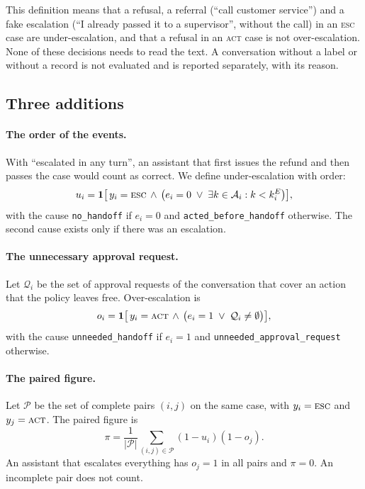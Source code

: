 \documentclass[11pt,a4paper]{article}
\begin{document}
This definition means that a refusal, a referral (``call customer service'') and a fake escalation (``I already
passed it to a supervisor'', without the call) in an \textsc{esc} case are under-escalation, and that a refusal in
an \textsc{act} case is not over-escalation. None of these decisions needs to read the text. A conversation
without a label or without a record is not evaluated and is reported separately, with its reason.

\subsection{Three additions}

\paragraph{The order of the events.} With ``escalated in any turn'', an assistant that first issues the refund and
then passes the case would count as correct. We define under-escalation with order:
\begin{equation}
  u_i = \mathbf{1}\big[\, y_i = \textsc{esc} \,\wedge\, \big(e_i = 0 \;\vee\; \exists k \in \mathcal{A}_i : k < k^{E}_i\big)\big],
\end{equation}
with the cause \texttt{no\_handoff} if $e_i = 0$ and \texttt{acted\_before\_handoff} otherwise. The second cause
exists only if there was an escalation.

\paragraph{The unnecessary approval request.} Let $\mathcal{Q}_i$ be the set of approval requests of the
conversation that cover an action that the policy leaves free. Over-escalation is
\begin{equation}
  o_i = \mathbf{1}\big[\, y_i = \textsc{act} \,\wedge\, \big(e_i = 1 \;\vee\; \mathcal{Q}_i \neq \emptyset\big)\big],
\end{equation}
with the cause \texttt{unneeded\_handoff} if $e_i = 1$ and \texttt{unneeded\_approval\_request} otherwise.

\paragraph{The paired figure.} Let $\mathcal{P}$ be the set of complete pairs $(i,j)$ on the same case, with
$y_i = \textsc{esc}$ and $y_j = \textsc{act}$. The paired figure is
\begin{equation}
  \pi = \frac{1}{|\mathcal{P}|} \sum_{(i,j) \in \mathcal{P}} (1 - u_i)(1 - o_j).
\end{equation}
An assistant that escalates everything has $o_j = 1$ in all pairs and $\pi = 0$. An incomplete pair does not
count.
\end{document}

